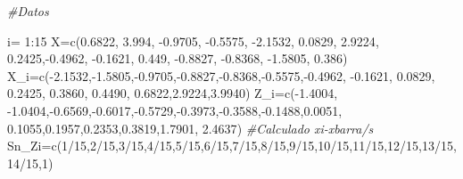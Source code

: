 \documentclass[
  a4paper,
  oneside,
  openany]{book}
\newenvironment{Shaded}{\begin{snugshade}}{\end{snugshade}}
\newcommand{\CommentTok}[1]{\textcolor[rgb]{0.56,0.35,0.01}{\textit{#1}}}
\newcommand{\DecValTok}[1]{\textcolor[rgb]{0.00,0.00,0.81}{#1}}
\newcommand{\FloatTok}[1]{\textcolor[rgb]{0.00,0.00,0.81}{#1}}
\newcommand{\FunctionTok}[1]{\textcolor[rgb]{0.00,0.00,0.00}{#1}}
\newcommand{\NormalTok}[1]{#1}
\newcommand{\OtherTok}[1]{\textcolor[rgb]{0.56,0.35,0.01}{#1}}
\newcommand{\SpecialCharTok}[1]{\textcolor[rgb]{0.00,0.00,0.00}{#1}}
\begin{document}
\begin{Shaded}
\begin{Highlighting}[]
\CommentTok{\#Datos}

\NormalTok{i}\OtherTok{=} \DecValTok{1}\SpecialCharTok{:}\DecValTok{15}
\NormalTok{X}\OtherTok{=}\FunctionTok{c}\NormalTok{(}\FloatTok{0.6822}\NormalTok{, }\FloatTok{3.994}\NormalTok{, }\SpecialCharTok{{-}}\FloatTok{0.9705}\NormalTok{, }\SpecialCharTok{{-}}\FloatTok{0.5575}\NormalTok{, }\SpecialCharTok{{-}}\FloatTok{2.1532}\NormalTok{, }\FloatTok{0.0829}\NormalTok{, }\FloatTok{2.9224}\NormalTok{,}
    \FloatTok{0.2425}\NormalTok{,}\SpecialCharTok{{-}}\FloatTok{0.4962}\NormalTok{, }\SpecialCharTok{{-}}\FloatTok{0.1621}\NormalTok{, }\FloatTok{0.449}\NormalTok{, }\SpecialCharTok{{-}}\FloatTok{0.8827}\NormalTok{, }\SpecialCharTok{{-}}\FloatTok{0.8368}\NormalTok{, }\SpecialCharTok{{-}}\FloatTok{1.5805}\NormalTok{, }\FloatTok{0.386}\NormalTok{)}
\NormalTok{X\_i}\OtherTok{=}\FunctionTok{c}\NormalTok{(}\SpecialCharTok{{-}}\FloatTok{2.1532}\NormalTok{,}\SpecialCharTok{{-}}\FloatTok{1.5805}\NormalTok{,}\SpecialCharTok{{-}}\FloatTok{0.9705}\NormalTok{,}\SpecialCharTok{{-}}\FloatTok{0.8827}\NormalTok{,}\SpecialCharTok{{-}}\FloatTok{0.8368}\NormalTok{,}\SpecialCharTok{{-}}\FloatTok{0.5575}\NormalTok{,}\SpecialCharTok{{-}}\FloatTok{0.4962}\NormalTok{, }\SpecialCharTok{{-}}\FloatTok{0.1621}\NormalTok{,  }\FloatTok{0.0829}\NormalTok{,  }\FloatTok{0.2425}\NormalTok{,}
      \FloatTok{0.3860}\NormalTok{, }\FloatTok{0.4490}\NormalTok{,  }\FloatTok{0.6822}\NormalTok{,}\FloatTok{2.9224}\NormalTok{,}\FloatTok{3.9940}\NormalTok{)}
\NormalTok{Z\_i}\OtherTok{=}\FunctionTok{c}\NormalTok{(}\SpecialCharTok{{-}}\FloatTok{1.4004}\NormalTok{, }\SpecialCharTok{{-}}\FloatTok{1.0404}\NormalTok{,}\SpecialCharTok{{-}}\FloatTok{0.6569}\NormalTok{,}\SpecialCharTok{{-}}\FloatTok{0.6017}\NormalTok{,}\SpecialCharTok{{-}}\FloatTok{0.5729}\NormalTok{,}\SpecialCharTok{{-}}\FloatTok{0.3973}\NormalTok{,}\SpecialCharTok{{-}}\FloatTok{0.3588}\NormalTok{,}\SpecialCharTok{{-}}\FloatTok{0.1488}\NormalTok{,}\FloatTok{0.0051}\NormalTok{,}
\FloatTok{0.1055}\NormalTok{,}\FloatTok{0.1957}\NormalTok{,}\FloatTok{0.2353}\NormalTok{,}\FloatTok{0.3819}\NormalTok{,}\FloatTok{1.7901}\NormalTok{,  }\FloatTok{2.4637}\NormalTok{) }\CommentTok{\#Calculado xi{-}xbarra/s}
\NormalTok{Sn\_Zi}\OtherTok{=}\FunctionTok{c}\NormalTok{(}\DecValTok{1}\SpecialCharTok{/}\DecValTok{15}\NormalTok{,}\DecValTok{2}\SpecialCharTok{/}\DecValTok{15}\NormalTok{,}\DecValTok{3}\SpecialCharTok{/}\DecValTok{15}\NormalTok{,}\DecValTok{4}\SpecialCharTok{/}\DecValTok{15}\NormalTok{,}\DecValTok{5}\SpecialCharTok{/}\DecValTok{15}\NormalTok{,}\DecValTok{6}\SpecialCharTok{/}\DecValTok{15}\NormalTok{,}\DecValTok{7}\SpecialCharTok{/}\DecValTok{15}\NormalTok{,}\DecValTok{8}\SpecialCharTok{/}\DecValTok{15}\NormalTok{,}\DecValTok{9}\SpecialCharTok{/}\DecValTok{15}\NormalTok{,}\DecValTok{10}\SpecialCharTok{/}\DecValTok{15}\NormalTok{,}\DecValTok{11}\SpecialCharTok{/}\DecValTok{15}\NormalTok{,}\DecValTok{12}\SpecialCharTok{/}\DecValTok{15}\NormalTok{,}\DecValTok{13}\SpecialCharTok{/}\DecValTok{15}\NormalTok{,}\DecValTok{14}\SpecialCharTok{/}\DecValTok{15}\NormalTok{,}\DecValTok{1}\NormalTok{)}

\end{Highlighting}
\end{Shaded}
\end{document}

